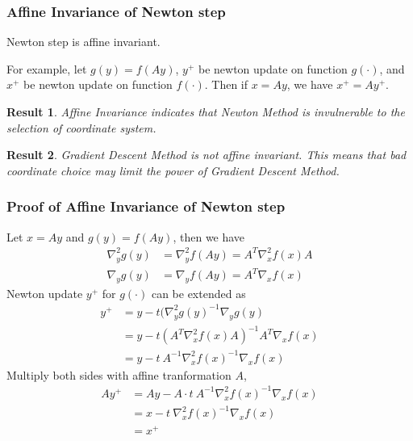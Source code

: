 \documentclass{beamer}
\newtheorem{result}{Result}
\begin{document}
\begin{frame}
\frametitle{Affine Invariance of Newton step}
\begin{lemma}
    Newton step is affine invariant. 
\end{lemma}
For example, let $g(y) = f(Ay)$, $y^{+}$ be newton update on function
$g(\cdot)$, and 
$x^{+}$ be newton update on function $f(\cdot)$. 
Then if $x=Ay$, we have $x^{+} = Ay^{+}$.
\begin{result}
    Affine Invariance indicates that Newton Method is invulnerable to the
    selection of coordinate system. 
\end{result}
\begin{result}
    Gradient Descent Method is not affine invariant. This means
    that bad coordinate choice may limit the power of Gradient Descent Method.
\end{result}
\end{frame}
\begin{frame}
\frametitle{Proof of Affine Invariance of Newton step}
    Let $x = Ay$ and $g(y) = f(Ay)$, then we have
    \begin{align}
       \nabla^2_{y}g(y) &= \nabla^2_{y}f(Ay) = A^T \nabla^2_{x}f(x) A \\
       \nabla_{y}g(y)   &= \nabla_{y}f(Ay) = A^T \nabla_{x}f(x)
    \end{align}
    Newton update $y^{+}$ for $g(\cdot)$ can be extended as
    \begin{align}
        y^{+} &= y - t(\nabla^2_{y}g(y)^{-1} \nabla_{y}g(y)      \nonumber \\
        &= y - t(A^T \nabla^2_{x}f(x) A)^{-1} A^T \nabla_{x}f(x) \nonumber \\
        &= y - t\ A^{-1} \nabla^2_{x}f(x)^{-1} \nabla_{x}f(x)
    \end{align}
    Multiply both sides with affine tranformation $A$, 
    \begin{align}
        Ay^{+} &= Ay - A \cdot t\ A^{-1} \nabla^2_{x}f(x)^{-1} \nabla_{x}f(x)  \nonumber \\
        &= x - t\ \nabla^2_{x}f(x)^{-1} \nabla_{x}f(x) \nonumber \\
        &= x^{+}
    \end{align}
\end{frame}
\end{document}
